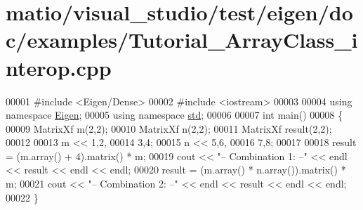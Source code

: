\hypertarget{matio_2visual__studio_2test_2eigen_2doc_2examples_2_tutorial___array_class__interop_8cpp_source}{}\section{matio/visual\+\_\+studio/test/eigen/doc/examples/\+Tutorial\+\_\+\+Array\+Class\+\_\+interop.cpp}
\label{matio_2visual__studio_2test_2eigen_2doc_2examples_2_tutorial___array_class__interop_8cpp_source}

\begin{DoxyCode}
00001 \textcolor{preprocessor}{#include <Eigen/Dense>}
00002 \textcolor{preprocessor}{#include <iostream>}
00003 
00004 \textcolor{keyword}{using namespace }\hyperlink{namespace_eigen}{Eigen};
00005 \textcolor{keyword}{using namespace }\hyperlink{namespacestd}{std};
00006 
00007 \textcolor{keywordtype}{int} main()
00008 \{
00009   MatrixXf m(2,2);
00010   MatrixXf n(2,2);
00011   MatrixXf result(2,2);
00012 
00013   m << 1,2,
00014        3,4;
00015   n << 5,6,
00016        7,8;
00017   
00018   result = (m.array() + 4).matrix() * m;
00019   cout << \textcolor{stringliteral}{"-- Combination 1: --"} << endl << result << endl << endl;
00020   result = (m.array() * n.array()).matrix() * m;
00021   cout << \textcolor{stringliteral}{"-- Combination 2: --"} << endl << result << endl << endl;
00022 \}
\end{DoxyCode}
